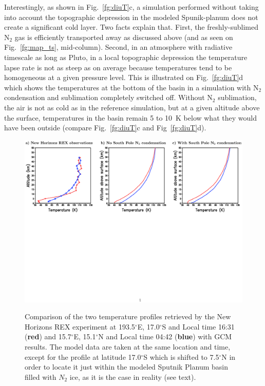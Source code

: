 Interestingly, as shown in Fig.~\ref{fg:diuT}c, a simulation performed 
without taking into account the topographic depression
in the modeled Spunik-planum does not create a significant cold layer.
Two facts explain that. First, the freshly-sublimed N$_2$ gas is efficiently 
transported away as discussed above (and as seen on Fig.~\ref{fg:map_ts}, mid-column).  
Second, in an atmosphere with radiative timescale as long as Pluto,  
in a local topographic depression the temperature lapse rate is not as steep as on average
because temperatures tend to be homogeneous at a given pressure level. This is illustrated
on Fig.~\ref{fg:diuT}d which shows the temperatures at the bottom of the basin 
in a simulation with N$_2$ condensation and
sublimation completely switched off. Without N$_2$ sublimation, the air is not as cold 
as in the reference simulation, but at a given altitude above the surface, 
temperatures in the basin remain 5 to 10~K below what they would have been outside (compare
Fig.~\ref{fg:diuT}c and Fig~\ref{fg:diuT}d). 






\begin{figure}
  \begin{center}
   \includegraphics[width=17.cm,angle=-0,clip]{figures/fig_hinson.eps} \\
    \caption{
\label{fg:hinson}
Comparison of the two temperature profiles retrieved by the New Horizons REX experiment 
\citep{Hins:15dps,Glad:16} 
at 193.5$^\circ$E, 17.0$^\circ$S and Local time 16:31 ({\bf red}) and 15.7$^\circ$E,
15.1$^\circ$N and Local time 04:42 ({\bf blue}) with GCM results. 
The model data are taken at the same
location and time, except for the profile at latitude 17.0$^\circ$S which is shifted to 7.5$^\circ$N
in order to locate it just within the modeled Sputnik Planum basin filled with $N_2$ ice, as it is the case in
reality (see text).  
}
  \end{center}
\end{figure}


